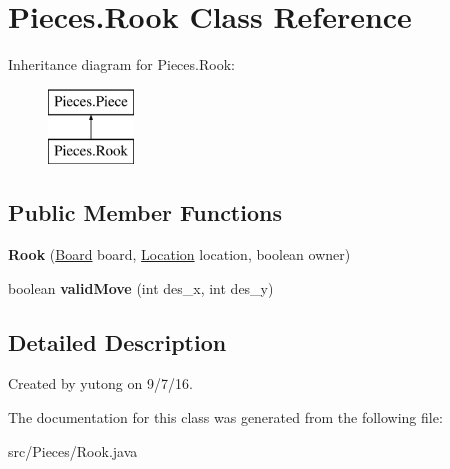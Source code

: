 \hypertarget{classMain_1_1Rook}{\section{Pieces.\-Rook Class Reference}
\label{classMain_1_1Rook}
}
Inheritance diagram for Pieces.\-Rook\-:\begin{figure}[H]
\begin{center}
\leavevmode
\includegraphics[height=2.000000cm]{classMain_1_1Rook}
\end{center}
\end{figure}
\subsection*{Public Member Functions}
\begin{DoxyCompactItemize}
\item 
\hypertarget{classMain_1_1Rook_a3fa30f6990b295c495cb14e16c39a9c9}{{\bfseries Rook} (\hyperlink{classMain_1_1Board}{Board} board, \hyperlink{classMain_1_1Location}{Location} location, boolean owner)}\label{classMain_1_1Rook_a3fa30f6990b295c495cb14e16c39a9c9}

\item 
\hypertarget{classMain_1_1Rook_a8b9d6baec280f5f44c4ba21e7e5cd19f}{boolean {\bfseries valid\-Move} (int des\-\_\-x, int des\-\_\-y)}\label{classMain_1_1Rook_a8b9d6baec280f5f44c4ba21e7e5cd19f}

\end{DoxyCompactItemize}


\subsection{Detailed Description}
Created by yutong on 9/7/16. 

The documentation for this class was generated from the following file\-:\begin{DoxyCompactItemize}
\item 
src/\-Pieces/Rook.\-java\end{DoxyCompactItemize}
